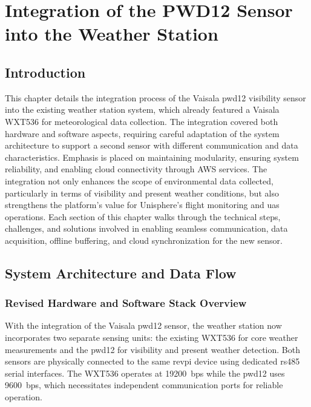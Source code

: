 

\setlength{\headheight}{27.41803pt}
\chapter{Integration of the PWD12 Sensor into the Weather Station}

\section*{Introduction}

This chapter details the integration process of the Vaisala \gls{pwd12} visibility sensor into the existing weather station system, which already featured a Vaisala WXT536 for meteorological data collection. The integration covered both hardware and software aspects, requiring careful adaptation of the system architecture to support a second sensor with different communication and data characteristics. Emphasis is placed on maintaining modularity, ensuring system reliability, and enabling cloud connectivity through AWS services. The integration not only enhances the scope of environmental data collected, particularly in terms of visibility and present weather conditions, but also strengthens the platform’s value for Unisphere’s flight monitoring and \gls{uas} operations. Each section of this chapter walks through the technical steps, challenges, and solutions involved in enabling seamless communication, data acquisition, offline buffering, and cloud synchronization for the new sensor.

\section{System Architecture and Data Flow}

\subsection{Revised Hardware and Software Stack Overview}

With the integration of the Vaisala \gls{pwd12} sensor, the weather station now incorporates two separate sensing units: the existing WXT536 for core weather measurements and the \gls{pwd12} for visibility and present weather detection. Both sensors are physically connected to the same \gls{revpi} device using dedicated \gls{rs485} serial interfaces. The WXT536 operates at 19200~bps while the \gls{pwd12} uses 9600~bps, which necessitates independent communication ports for reliable operation.

